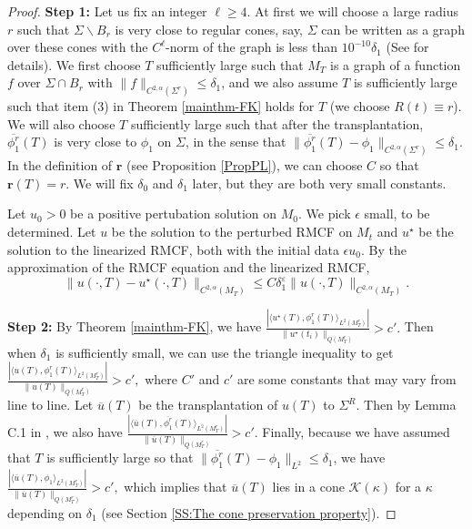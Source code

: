 \documentclass[12pt]{amsart}
\numberwithin{equation}{section}
\numberwithin{equation}{section}
\newcommand{\eps}{\varepsilon}
\newcommand{\cK}{\mathcal{K}}
\begin{document}
	\begin{proof}
		
		\textbf{Step 1:} Let us fix an integer $\ell\geq 4$. At first we will choose a large radius $r$ such that $\Sigma\backslash B_r$ is very close to regular cones, say,  $\Sigma$ can be written as a graph over these cones with the $C^\ell$-norm of the graph is less than $10^{-10}\delta_1$ (See \cite[Section 2]{CS} for details). We first choose $T$ sufficiently large such that $M_T$ is a graph of a function $f$ over $\Sigma\cap B_r$ with $\|f\|_{C^{2,\alpha}(\Sigma^r)}\leq \delta_1$, and we also assume $T$ is sufficiently large such that item (3) in Theorem \ref{mainthm-FK} holds for $T$ (we choose $R(t)\equiv r$). We will also choose $T$ sufficiently large such that after the transplantation, $\overline{\phi_1^r}(T)$ is very close to $\phi_1$ on $\Sigma$, in the sense that $\|\overline{\phi_1^r}(T)-\phi_1\|_{C^{2,\alpha}(\Sigma^r)}\leq \delta_1$. In the definition of $\mathbf{r}$ (see Proposition \ref{PropPL}), we can choose $C$ so that $\mathbf{r}(T)=r$. We will fix $\delta_0$ and $\delta_1$ later, but they are both very small constants. 
		
		Let $u_0>0$ be a positive pertubation solution on $M_0$. We pick $\epsilon$ small, to be determined. Let $u$ be the solution to the perturbed RMCF on $M_t$ and $u^\star$ be the solution to the linearized RMCF, both with the initial data $\epsilon u_0$. By the approximation of the RMCF equation and the linearized RMCF, $$\|u(\cdot,T)-u^\star(\cdot,T)\|_{C^{2,\alpha}(M_T)}\leq C\delta_1^\eps \|u(\cdot,T)\|_{C^{2,\alpha}(M_T)}.$$ 
		
		\textbf{Step 2:}  By Theorem  \ref{mainthm-FK}, we have
		$ \frac{|\langle u^\star(T),\phi^{r}_1(T)\rangle_{L^2(M^{r}_{T})}|}{\|u^\star(t_i)\|_{Q(M^{r}_{T})}}>c'.$
		Then when $\delta_1$ is sufficiently small, we can use the triangle inequality to get
		$  \frac{|\langle u(T),\phi^{r}_1(T)\rangle_{L^2(M^{r}_{T})}|}{\|u(T)\|_{Q(M^{r}_{T})}}>c',$
		where $C'$ and $c'$ are some constants that may vary from line to line. Let $\overline{u}(T)$ be the transplantation of $u(T)$ to $\Sigma^R$. Then by Lemma C.1 in \cite{SX}, we also have
		$\frac{|\langle \overline u(T),\overline{\phi^{r}_1}(T)\rangle_{L^2(M^{r}_{T})}|}{\|\overline u(T)\|_{Q(M^{r}_{T})}}>c'.$
		Finally, because we have assumed that $T$ is sufficiently large so that $\|\overline{\phi_1^r}(T)-\phi_1\|_{L^2}\leq \delta_1$,  we have	$\frac{|\langle \overline u(T),\phi_1\rangle_{L^2(M^{r}_{T})}|}{\|\overline u(T)\|_{Q(M^{r}_{T})}}>c',$ which implies that $\overline{u}(T)$ lies in a cone $\cK(\kappa)$ for a $\kappa$ depending on $\delta_1$ (see Section \ref{SS:The cone preservation property}).
		

\end{proof}
\end{document}

